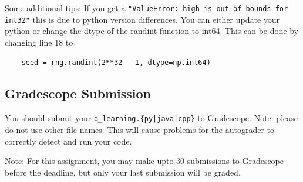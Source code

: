 \documentclass[11pt,addpoints,answers]{exam}
\begin{document}
Some additional tips: If you get a \texttt{"ValueError: high is out of bounds for int32"} this is due to python version differences. You can either update your python or change the dtype of the randint function to int64. This can be done by changing line 18 to
\begin{verbatim}
    seed = rng.randint(2**32 - 1, dtype=np.int64)
\end{verbatim}


\subsection{Gradescope Submission}

You should submit your \texttt{q\_learning.\{py|java|cpp\}} to Gradescope.
Note: please do not use other file names. This will cause problems for the autograder to correctly detect and run your code.

Note: For this assignment, you may make upto 30 submissions to Gradescope before the deadline, but only your last submission will be graded.
\end{document}
